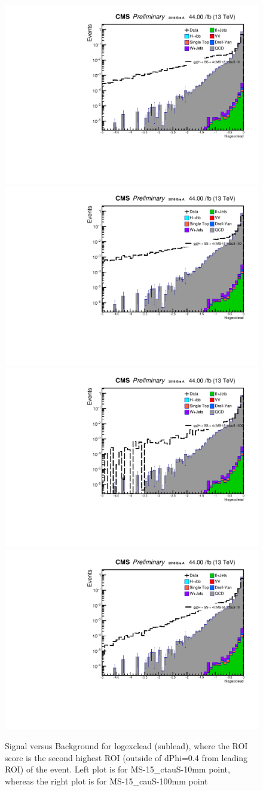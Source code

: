  \begin{figure}[h!]
	 \caption{Signal versus Background for logexclead (sublead), where the ROI score is the second highest ROI (outside of dPhi=0.4 from leading ROI) of the event. Left plot is for MS-15\_ctauS-10mm point, whereas the right plot is for MS-15\_cauS-100mm point}
   \label{fig:excROIscore}
   \centering
   \includegraphics[width=0.47\linewidth]{figs/log_AnalysisNote_MS-15_ctauS-10_hlogexclead.pdf}
   \includegraphics[width=0.47\linewidth]{figs/log_AnalysisNote_MS-15_ctauS-100_hlogexclead.pdf}
   \includegraphics[width=0.47\linewidth]{figs/log_AnalysisNote_MS-15_ctauS-1000_hlogexclead.pdf}
   \includegraphics[width=0.47\linewidth]{figs/log_AnalysisNote_MS-55_ctauS-10_hlogexclead.pdf}
 \end{figure}

